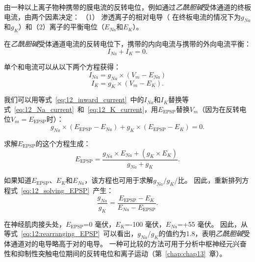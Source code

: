 \begin{proposition}[终板电位的反转电位] \label{box:12_1}
	
	\quad \quad 由一种以上离子物种携带的膜电流的反转电位，例如通过\textit{乙酰胆碱}受体通道的终板电流，由两个因素决定：
	（1） 渗透离子的相对电导（ 在终板电流的情况下为$g_{Na}$和$g_K$）和（2）离子的平衡电位（$E_{Na}$和$E_K$）。
	
	\quad \quad 在\textit{乙酰胆碱}受体通道电流的反转电位下，携带的内向电流与携带的外向电流平衡：
	\begin{equation}\label{eq:12_inward_current}
		I_{Na} + I_K = 0.
	\end{equation}
	
	\quad \quad 单个和电流可以从以下两个方程获得：
	\begin{equation}\label{eq:12_Na_current}
		I_{Na} = g_{Na} \times (V_m - E_{Na})
	\end{equation}
	\begin{equation}\label{eq:12_K_current}
		I_K = g_K \times (V_m - E_K).
	\end{equation}
	
	\quad \quad 我们可以用等式~\ref{eq:12_inward_current}~中的$ I_{Na} $和$ I_K $替换等式~\ref{eq:12_Na_current}~和~\ref{eq:12_K_current}，用$E_{\text{EPSP}}$替换$V_m$（因为在反转电位$V_m = E_{\text{EPSP}}$时）：
	\begin{equation}\label{eq:12_substitude_inward_current}
		g_{Na} \times (E_{\text{EPSP}} - E_{Na}) + 
		g_K \times (E_{\text{EPSP}} - E_K)
		= 0.
	\end{equation}
	
	\quad \quad 求解$ E_{\text{EPSP}} $的这个方程生成：
	\begin{equation}\label{eq:12_solving_EPSP}
		E_{\text{EPSP}} = 
			\frac{
				g_{Na} \times E_{Na} + (g_K \times E_K)
			}
			{
				g_{Na} + g_K
			}.
	\end{equation}
	
	\quad \quad 如果知道$E_{\text{EPSP}}$、$E_K$和$E_{Na}$，该方程也可用于求解$g_{Na} / g_K$/比。
	因此，重新排列方程式~\ref{eq:12_solving_EPSP}~产生：
	\begin{equation}\label{eq:12:rearranging_EPSP}
		\frac{g_{Na}}{g_K} = 
		\frac{E_{\text{EPSP}} - E_{K}}{E_{Na} - E_{\text{EPSP}}}.
	\end{equation}
	
	\quad \quad 在神经肌肉接头处，$E_{\text{EPSP}}$=0 毫伏，$E_K$=-100 毫伏，$E_{Na}$=+55 毫伏。
	因此，从等式~\ref{eq:12:rearranging_EPSP}~可以看出，$g_{Na} / g_K$的值约为1.8，表明\textit{乙酰胆碱}受体通道对的电导略高于对的电导。
	一种可比较的方法可用于分析中枢神经元兴奋性和抑制性突触电位期间的反转电位和离子运动（第~\ref{chap:chap13}~章）。
	
\end{proposition}



